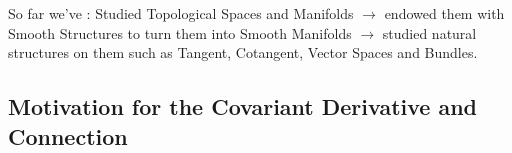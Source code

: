 \documentclass[11pt]{article}
\begin{document}
So far we've : 
Studied Topological Spaces and Manifolds $\rightarrow$ endowed them with Smooth Structures to turn them into Smooth Manifolds $\rightarrow$ studied natural structures on them such as Tangent, Cotangent, Vector Spaces and Bundles.

\vskip 1cm
\subsection{Motivation for the Covariant Derivative and Connection}
\end{document}
